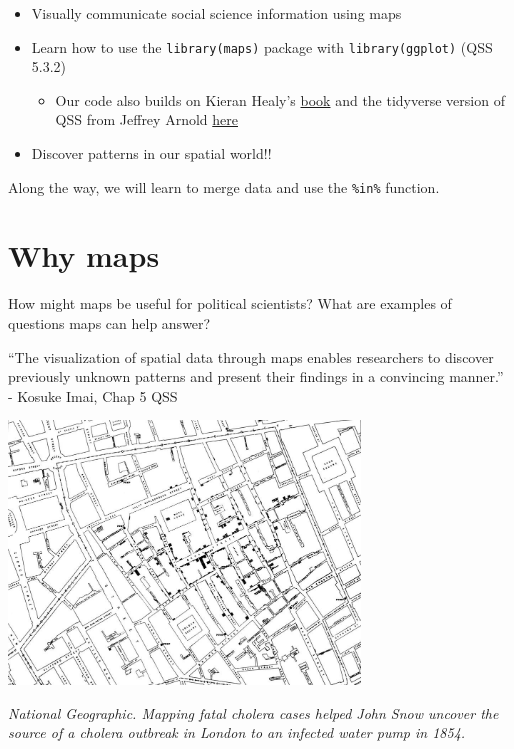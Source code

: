 \documentclass[
  letterpaper,
  DIV=11,
  numbers=noendperiod]{scrreprt}
\providecommand{\tightlist}{%
  \setlength{\itemsep}{0pt}\setlength{\parskip}{0pt}}\usepackage{longtable,booktabs,array}
\begin{document}
\begin{itemize}
\tightlist
\item
  Visually communicate social science information using maps
\item
  Learn how to use the \texttt{library(maps)} package with
  \texttt{library(ggplot)} (QSS 5.3.2)

  \begin{itemize}
  \tightlist
  \item
    Our code also builds on Kieran Healy's
    \href{https://socviz.co/maps.html\#maps}{book} and the tidyverse
    version of QSS from Jeffrey Arnold
    \href{https://jrnold.github.io/qss-tidy/discovery.html}{here}
  \end{itemize}
\item
  Discover patterns in our spatial world!!
\end{itemize}

Along the way, we will learn to merge data and use the \texttt{\%in\%}
function.

\hypertarget{why-maps}{%
\section{Why maps}\label{why-maps}}

How might maps be useful for political scientists? What are examples of
questions maps can help answer?

``The visualization of spatial data through maps enables researchers to
discover previously unknown patterns and present their findings in a
convincing manner.'' - Kosuke Imai, Chap 5 QSS

\includegraphics[width=0.7\textwidth,height=\textheight]{images/snowmap.jpeg}

\emph{National Geographic. Mapping fatal cholera cases helped John Snow
uncover the source of a cholera outbreak in London to an infected water
pump in 1854.}
\end{document}
